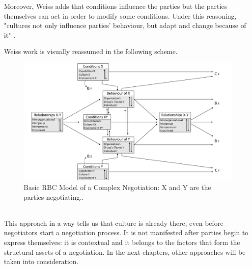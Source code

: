 \documentclass[../main.tex]{subfiles}
\begin{document}
Moreover, Weiss adds that conditions influence the parties but the parties themselves can act in order to modify some conditions. Under this reasoning, "cultures not only influence parties' behaviour, but adapt and change because of it" \mancite\autocite[289]{weiss}.

Weiss work is visually reassumed in the following scheme.

\begin{figure}[h]
    \centering\includegraphics[width=\textwidth]{images/rbc.pdf}
    \caption{Basic RBC Model of a Complex Negotiation: X and Y are the parties negotiating.\mancite\autocite[276]{weiss}.}
\end{figure}\\

This approach in a way tells us that culture is already there, even before negotiators start a negotiation process. It is not manifested after parties begin to express themselves: it is contextual and it belongs to the factors that form the structural assets of a negotiation. In the next chapters, other approaches will be taken into consideration.
\end{document}
